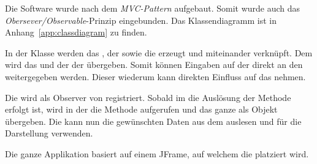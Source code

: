 Die Software wurde nach dem \emph{MVC-Pattern} aufgebaut. Somit wurde auch das
\emph{Obersever/Observable}-Prinzip  eingebunden. Das  Klassendiagramm ist  in
Anhang~\ref{app:classdiagram} zu finden.

In   der    Klasse       werden   das    ,   der
   sowie   die      erzeugt   und   miteinander
verkn\"upft. Dem      wird   das     und   der
  der    \"ubergeben. Somit  k\"onnen  Eingaben
auf  der     direkt   an  den     weitergegeben
werden. Dieser wiederum kann direkten Einfluss auf das  nehmen.

Die   wird  als  Observer von   registriert. Sobald  im
 die Ausl\"osung der Methode  erfolgt ist,
wird  in  der    die Methode    aufgerufen  und  das
ganze    als  Objekt  \"ubergeben. Die   kann  nun  die
gew\"unschten Daten  aus dem   auslesen und f\"ur  die Darstellung
verwenden.

Die ganze  Applikation basiert auf  einem JFrame, auf welchem  die 
platziert wird.
